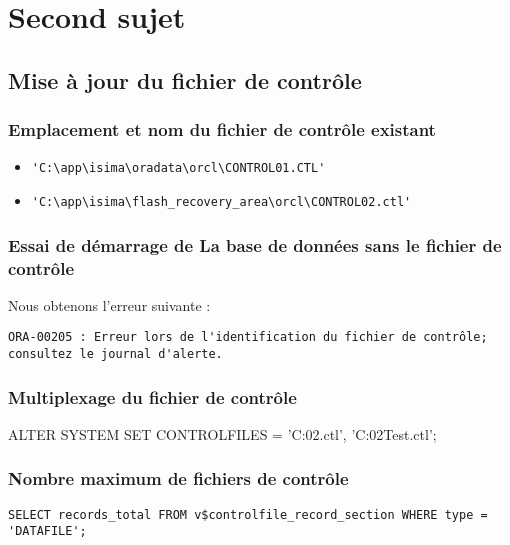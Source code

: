 \section{Second sujet}
\subsection{Mise à jour du fichier de contrôle}

\subsubsection{Emplacement et nom du fichier de contrôle existant}

\begin{itemize}
	\item \verb|'C:\app\isima\oradata\orcl\CONTROL01.CTL'|
	\item \verb|'C:\app\isima\flash_recovery_area\orcl\CONTROL02.ctl'|
\end{itemize}

\subsubsection{Essai de démarrage de La base de données sans le fichier de contrôle}

Nous obtenons l’erreur suivante :

\begin{verbatim}
ORA-00205 : Erreur lors de l'identification du fichier de contrôle; consultez le journal d'alerte.
\end{verbatim}

\subsubsection{Multiplexage du fichier de contrôle}

\begin{verbatimtab}
ALTER SYSTEM SET CONTROLFILES = 'C:\app\isima\oradata\orcl\CONTROL02.ctl',
	'C:\app\isima\oradata\orcl{}\CTRL02Test.ctl';
\end{verbatimtab}

\subsubsection{Nombre maximum de fichiers de contrôle}

\begin{verbatim}
SELECT records_total FROM v$controlfile_record_section WHERE type = 'DATAFILE';
\end{verbatim}


